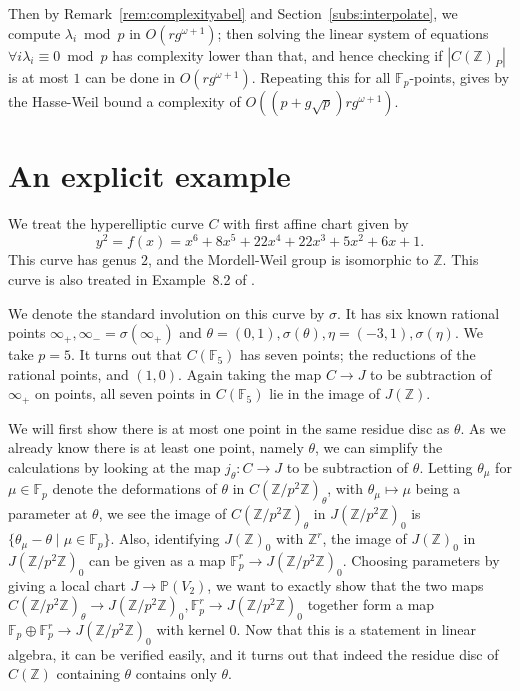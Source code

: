 \documentclass[12pt]{article}
\newcommand{\Z}{\mathbb{Z}}
\renewcommand{\P}{\mathbb{P}}
\newcommand{\F}{\mathbb{F}}
\theoremstyle{plain}
\theoremstyle{definition}
\theoremstyle{remark}
\begin{document}
Then by Remark~\ref{rem:complexityabel} and Section~\ref{subs:interpolate}, we compute $\lambda_i \bmod p$ in $O(rg^{\omega+1})$; then solving the linear system of equations $\forall i \lambda_i \equiv 0 \bmod p$ has complexity lower than that, and hence checking if $|C(\Z)_P|$ is at most $1$ can be done in $O(rg^{\omega+1})$. Repeating this for all $\F_p$-points, gives by the Hasse-Weil bound a complexity of $O\left((p + g\sqrt{p})rg^{\omega+1}\right)$.

\section{An explicit example}
\label{section:example}
We treat the hyperelliptic curve $C$ with first affine chart given by
\[
y^2 = f(x) = x^6+ 8x^5+ 22x^4+ 22x^3+ 5x^2+ 6x+ 1.
\]
This curve has genus $2$, and the Mordell-Weil group is isomorphic to $\Z$. This curve is also treated in Example~8.2 of \cite{poonen12}.

We denote the standard involution on this curve by $\sigma$. It has six known rational points $\infty_+,\infty_- = \sigma(\infty_+)$ and $\theta = (0,1),\sigma(\theta),\eta=(-3,1),\sigma(\eta)$. We take $p = 5$. It turns out that $C(\F_5)$ has seven points; the reductions of the rational points, and $(1,0)$. Again taking the map $C \to J$ to be subtraction of $\infty_+$ on points, all seven points in $C(\F_5)$ lie in the image of $J(\Z)$.

We will first show there is at most one point in the same residue disc as $\theta$. As we already know there is at least one point, namely $\theta$, we can simplify the calculations by looking at the map $j_{\theta}: C \to J$ to be subtraction of $\theta$. Letting $\theta_{\mu}$ for $\mu \in \F_p$ denote the deformations of $\theta$ in $C(\Z/p^2\Z)_{\theta}$, with $\theta_\mu \mapsto \mu$ being a parameter at $\theta$, we see the image of $C(\Z/p^2\Z)_\theta$ in $J(\Z/p^2\Z)_0$ is $\{\theta_\mu - \theta \mid \mu \in \F_p\}$. Also, identifying $J(\Z)_0$ with $\Z^r$, the image of $J(\Z)_0$ in $J(\Z/p^2\Z)_0$ can be given as a map $\F_p^r \to J(\Z/p^2\Z)_0$. Choosing parameters by giving a local chart $J \to \P(V_2)$, we want to exactly show that the two maps $C(\Z/p^2\Z)_\theta \to J(\Z/p^2\Z)_0, \F_p^r \to J(\Z/p^2\Z)_0$ together form a map $\F_p \oplus \F_p^r \to J(\Z/p^2\Z)_0$ with kernel $0$. Now that this is a statement in linear algebra, it can be verified easily, and it turns out that indeed the residue disc of $C(\Z)$ containing $\theta$ contains only $\theta$.
\end{document}
